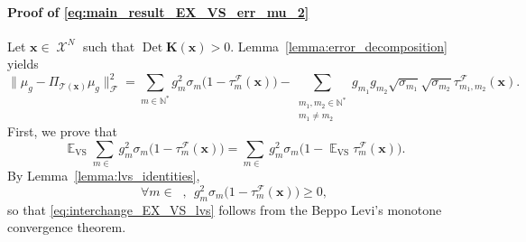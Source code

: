 \documentclass[twoside,11pt]{book}
\numberwithin{theorem}{chapter}
\numberwithin{definition}{chapter}
\numberwithin{proposition}{chapter}
\numberwithin{corollary}{chapter}
\numberwithin{example}{chapter}
\numberwithin{lemma}{chapter}
\DeclareMathOperator{\Det}{Det}
\DeclareMathOperator{\VS}{\mathrm{VS}}
\DeclareMathOperator{\EX}{\mathbb{E}}
\DeclareMathOperator{\F}{\mathcal{F}}
\DeclareMathOperator{\X}{\mathcal{X}}
\DeclareMathOperator{\Ns}{\mathbb{N}^{*}}
\newcommand{\rb}[1]{\textcolor{magenta}{#1}}
\begin{document}
\paragraph{Proof of \eqref{eq:main_result_EX_VS_err_mu_2}}
Let $\bm{x} \in \X^{N}$ such that $\Det \bm{K}(\bm{x}) >0 $. Lemma~\ref{lemma:error_decomposition} yields
\begin{equation}
\|\mu_{g} - \Pi_{\mathcal{T}(\bm{x})} \mu_{g}\|_{\F}^{2}  = \sum\limits_{m \in \mathbb{N}^{*}} g_{m}^{2} \sigma_{m}\bigg(1- \tau_{m}^{\F}(\bm{x})\bigg) - \sum\limits_{\substack{m_{1},m_{2} \in \mathbb{N}^{*} \\ m_{1} \neq m_{2}}}  g_{m_{1}}g_{m_{2}} \sqrt{\sigma_{m_{1}}} \sqrt{\sigma_{m_{2}}} \tau_{m_{1},m_{2}}^{\F}(\bm{x}).
\end{equation}
First, we prove that
\begin{equation}\label{eq:interchange_EX_VS_lvs}
\EX_{\VS} \sum\limits_{m \in \Ns} g_{m}^{2} \sigma_{m}\bigg(1- \tau_{m}^{\F}(\bm{x})\bigg) = \sum\limits_{m \in \Ns} g_{m}^{2} \sigma_{m}\bigg(1- \EX_{\VS}\tau_{m}^{\F}(\bm{x})\bigg).
\end{equation}
By Lemma~\ref{lemma:lvs_identities},
\begin{equation}
\forall m \in \Ns, \:\: g_{m}^{2} \sigma_{m}\bigg(1- \tau_{m}^{\F}(\bm{x})\bigg)\geq 0, \label{e:summable_term}
\end{equation}
so that \eqref{eq:interchange_EX_VS_lvs} follows from the Beppo Levi's monotone convergence theorem.
\end{document}
